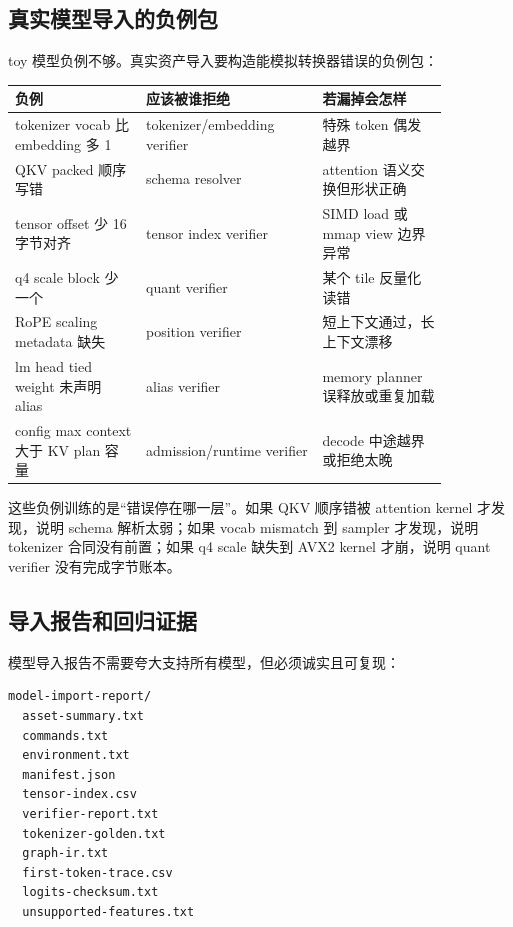 \subsection{真实模型导入的负例包}

toy 模型负例不够。真实资产导入要构造能模拟转换器错误的负例包：

\begin{center}
\small
\begin{tabular}{p{0.26\linewidth}p{0.35\linewidth}p{0.25\linewidth}}
\toprule
负例 & 应该被谁拒绝 & 若漏掉会怎样 \\
\midrule
tokenizer vocab 比 embedding 多 1 & tokenizer/embedding verifier & 特殊 token 偶发越界 \\
QKV packed 顺序写错 & schema resolver & attention 语义交换但形状正确 \\
tensor offset 少 16 字节对齐 & tensor index verifier & SIMD load 或 mmap view 边界异常 \\
q4 scale block 少一个 & quant verifier & 某个 tile 反量化读错 \\
RoPE scaling metadata 缺失 & position verifier & 短上下文通过，长上下文漂移 \\
lm head tied weight 未声明 alias & alias verifier & memory planner 误释放或重复加载 \\
config max context 大于 KV plan 容量 & admission/runtime verifier & decode 中途越界或拒绝太晚 \\
\bottomrule
\end{tabular}
\end{center}

这些负例训练的是“错误停在哪一层”。如果 QKV 顺序错被 attention kernel 才发现，说明 schema 解析太弱；如果 vocab mismatch 到 sampler 才发现，说明 tokenizer 合同没有前置；如果 q4 scale 缺失到 AVX2 kernel 才崩，说明 quant verifier 没有完成字节账本。

\subsection{导入报告和回归证据}

模型导入报告不需要夸大支持所有模型，但必须诚实且可复现：

\begin{lstlisting}[numbers=none,caption={真实模型导入报告目录}]
model-import-report/
  asset-summary.txt
  commands.txt
  environment.txt
  manifest.json
  tensor-index.csv
  verifier-report.txt
  tokenizer-golden.txt
  graph-ir.txt
  first-token-trace.csv
  logits-checksum.txt
  unsupported-features.txt
\end{lstlisting}


